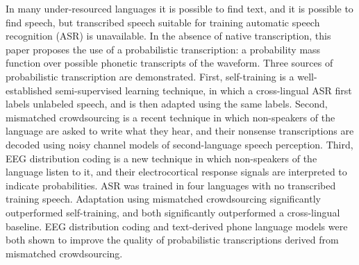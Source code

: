 In many under-resourced languages it is possible to find text, and it is possible to find speech, but transcribed speech suitable for training automatic speech recognition (ASR) is unavailable.  In the absence of native transcription, this paper proposes the use of a probabilistic transcription: a probability mass function over possible phonetic transcripts of the waveform.  Three sources of probabilistic transcription are demonstrated.  First, self-training is a well-established semi-supervised learning technique, in which a cross-lingual ASR first labels unlabeled speech, and is then adapted using the same labels.  Second, mismatched crowdsourcing is a recent technique in which non-speakers of the language are asked to write what they hear, and their nonsense transcriptions are decoded using noisy channel models of second-language speech perception.  Third, EEG distribution coding is a new technique in which non-speakers of the language listen to it, and their electrocortical response signals are interpreted to indicate probabilities.  ASR was trained in four languages with no transcribed training speech.  Adaptation using mismatched crowdsourcing significantly outperformed self-training, and both significantly outperformed a cross-lingual baseline.  EEG distribution coding and text-derived phone language models were both shown to improve the quality of probabilistic transcriptions derived from mismatched crowdsourcing.
